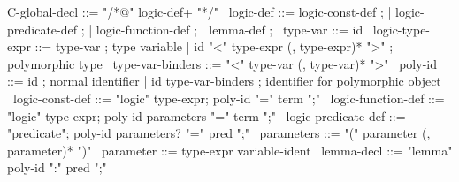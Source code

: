 \begin{syntax}
  C-global-decl ::= "/*@" logic-def+ "*/"
  \
  logic-def ::= logic-const-def ;
          | logic-predicate-def ;
          | logic-function-def ;
          | lemma-def ;
  \
  type-var ::= id
  \
  logic-type-expr ::= type-var ; type variable
  | id "<" type-expr (, type-expr)* ">" ; polymorphic type
  \
  type-var-binders ::= "<" type-var (, type-var)* ">"
  \
  poly-id ::= id ; normal identifier
  | id type-var-binders ; identifier for polymorphic object
  \
  logic-const-def ::= "logic" type-expr;
    poly-id "=" term ";"
  \
  logic-function-def ::= "logic" type-expr;
  poly-id parameters "=" term ";"
  \
  logic-predicate-def ::=
  "predicate";
  poly-id parameters? "=" pred ";"
  \
  parameters ::= "(" parameter (, parameter)* ")"
  \
  parameter ::= type-expr variable-ident
  \
  lemma-decl ::= "lemma" poly-id ":" pred ";" 
\end{syntax}